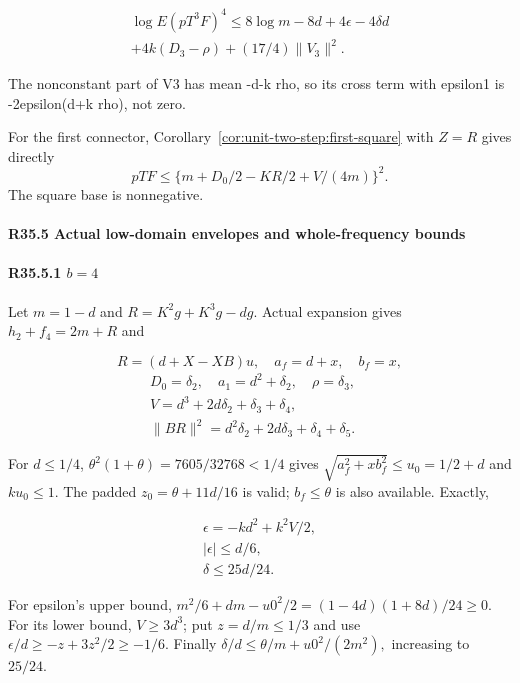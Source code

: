 \[
\begin{gathered}
\log E(pT^3F)^4\le8\log m-8d+4\epsilon-4\delta d\\
+4k(D_3-\rho)+(17/4)\|V_3\|^2.
\end{gathered}\tag{R35.A16}
\]

The nonconstant part of V3 has mean -d-k rho, so its cross term with epsilon1 is -2epsilon(d+k rho), not zero.

For the first connector, Corollary~\ref{cor:unit-two-step:first-square}
with $Z=R$ gives directly
\[
 pTF\le\{m+D_0/2-KR/2+V/(4m)\}^2.\tag{R35.A17}
\]
The square base is nonnegative.

\paragraph{R35.5 Actual low-domain envelopes and whole-frequency bounds}

\paragraph{R35.5.1 \(b=4\)}

Let \(m=1-d\) and \(R=K^2g+K^3g-dg.\) Actual expansion gives \(h_{2}+f_{4}=2m+R\) and

\[
R=(d+X-XB)u,\quad a_f=d+x,\quad b_f=x,
\]
\[
\begin{gathered}
D_0=\delta_2,\quad a_1=d^2+\delta_2,\quad\rho=\delta_3,\quad\\
V=d^3+2d\delta_2+\delta_3+\delta_4,\quad\\
\|BR\|^2=d^2\delta_2+2d\delta_3+\delta_4+\delta_5.
\end{gathered}\tag{R35.A18}
\]

For $d\le1/4$, $\theta^2(1+\theta)=7605/32768<1/4$ gives $\sqrt{a_f^2+xb_f^2}\le u_0=1/2+d$ and $ku_0\le1$. The padded $z_0=\theta+11d/16$ is valid; $b_f\le\theta$ is also available. Exactly,

\[
\begin{gathered}
\epsilon=-kd^2+k^2V/2,\\
|\epsilon|\le d/6,\\
\delta\le25d/24.
\end{gathered}\tag{R35.A19}
\]

For epsilon's upper bound,
\(m^2/6+dm-u0^2/2=(1-4d)(1+8d)/24\ge 0.\)
For its lower bound, \(V\ge 3d^3\); put \(z=d/m\le 1/3\) and use
\(\epsilon/d\ge -z+3z^2/2\ge -1/6.\)
Finally \(\delta/d\le \theta/m+u0^2/(2m^2),\allowbreak \) increasing to \(25/24.\)

